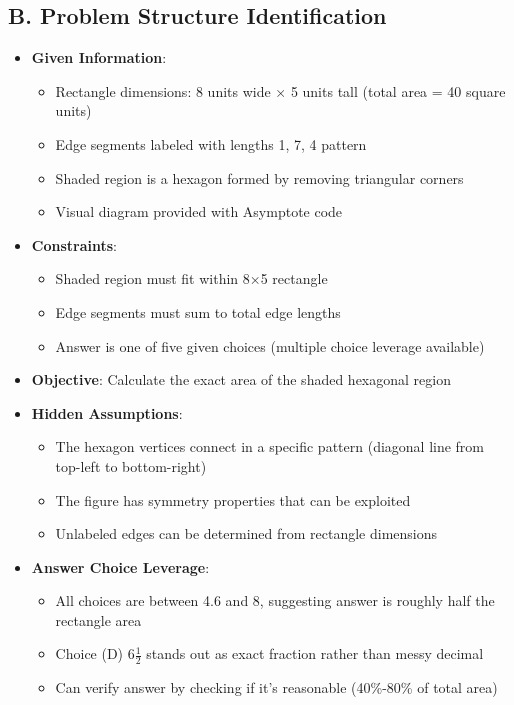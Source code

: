 \documentclass[11pt]{article}
\begin{document}
\begin{problemconfigbox}
\subsection*{B. Problem Structure Identification}
\begin{itemize}[leftmargin=*]
    \item \textbf{Given Information}: 
        \begin{itemize}
            \item Rectangle dimensions: 8 units wide × 5 units tall (total area = 40 square units)
            \item Edge segments labeled with lengths 1, 7, 4 pattern
            \item Shaded region is a hexagon formed by removing triangular corners
            \item Visual diagram provided with Asymptote code
        \end{itemize}
    \item \textbf{Constraints}: 
        \begin{itemize}
            \item Shaded region must fit within 8×5 rectangle
            \item Edge segments must sum to total edge lengths
            \item Answer is one of five given choices (multiple choice leverage available)
        \end{itemize}
    \item \textbf{Objective}: Calculate the exact area of the shaded hexagonal region
    \item \textbf{Hidden Assumptions}: 
        \begin{itemize}
            \item The hexagon vertices connect in a specific pattern (diagonal line from top-left to bottom-right)
            \item The figure has symmetry properties that can be exploited
            \item Unlabeled edges can be determined from rectangle dimensions
        \end{itemize}
    \item \textbf{Answer Choice Leverage}: 
        \begin{itemize}
            \item All choices are between 4.6 and 8, suggesting answer is roughly half the rectangle area
            \item Choice (D) $6\frac{1}{2}$ stands out as exact fraction rather than messy decimal
            \item Can verify answer by checking if it's reasonable (40\%-80\% of total area)
        \end{itemize}
\end{itemize}


\end{problemconfigbox}
\end{document}

